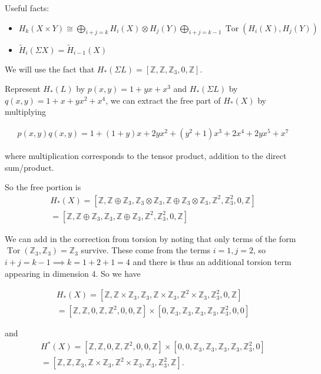 \begin{solution}

Useful facts:

\begin{itemize}
\tightlist
\item
  \(H_{k}(X\times Y) \cong \bigoplus _{{i+j=k}}H_{i}(X)\otimes H_{j}(Y) \bigoplus_{i+j=k-1}\operatorname{Tor}(H_i(X), H_j(Y))\)
\item
  \(\tilde H_i(\Sigma X) = \tilde H_{i-1}(X)\)
\end{itemize}

We will use the fact that
\(H_*(\Sigma L) = [{\mathbb{Z}}, {\mathbb{Z}}, {\mathbb{Z}}_3, 0, {\mathbb{Z}}]\).

Represent \(H_*(L)\) by \(p(x, y) = 1 + yx + x^3\) and \(H_*(\Sigma L)\)
by \(q(x,y) = 1 + x + yx^2 + x^4\), we can extract the free part of
\(H_*(X)\) by multiplying

\begin{align*}p(x,y)q(x,y) = 1 + (1+y)x + 2yx^2 + (y^2+1)x^3 + 2x^4 + 2yx^5 + x^7\end{align*}

where multiplication corresponds to the tensor product, addition to the
direct sum/product.

So the free portion is
\begin{align*}H_*(X) = [{\mathbb{Z}}, {\mathbb{Z}}\oplus {\mathbb{Z}}_3, {\mathbb{Z}}_3\otimes{\mathbb{Z}}_3, {\mathbb{Z}}\oplus {\mathbb{Z}}_3\otimes{\mathbb{Z}}_3, {\mathbb{Z}}^2, {\mathbb{Z}}_3^2, 0, {\mathbb{Z}}] \\
=[{\mathbb{Z}}, {\mathbb{Z}}\oplus {\mathbb{Z}}_3, {\mathbb{Z}}_3, {\mathbb{Z}}\oplus {\mathbb{Z}}_3, {\mathbb{Z}}^2, {\mathbb{Z}}_3^2, 0, {\mathbb{Z}}]
\end{align*}

We can add in the correction from torsion by noting that only terms of
the form
\(\operatorname{Tor}({\mathbb{Z}}_3, {\mathbb{Z}}_3) = {\mathbb{Z}}_3\)
survive. These come from the terms \(i=1, j=2\), so
\(i+j=k-1 \implies k = 1+2+1 = 4\) and there is thus an additional
torsion term appearing in dimension 4. So we have

\begin{align*}H_*(X) = [{\mathbb{Z}}, {\mathbb{Z}}\times {\mathbb{Z}}_3, {\mathbb{Z}}_3, {\mathbb{Z}}\times {\mathbb{Z}}_3, {\mathbb{Z}}^2 \times {\mathbb{Z}}_3, {\mathbb{Z}}_3^2, 0, {\mathbb{Z}}] \\ = [{\mathbb{Z}}, {\mathbb{Z}}, 0,{\mathbb{Z}},{\mathbb{Z}}^2,0,0,{\mathbb{Z}}] \times [0,{\mathbb{Z}}_3,{\mathbb{Z}}_3,{\mathbb{Z}}_3,{\mathbb{Z}}_3,{\mathbb{Z}}_3^2,0,0]\end{align*}

and
\begin{align*}H^*(X)= [{\mathbb{Z}}, {\mathbb{Z}}, 0,{\mathbb{Z}},{\mathbb{Z}}^2,0,0,{\mathbb{Z}}] \times [0, 0,{\mathbb{Z}}_3,{\mathbb{Z}}_3,{\mathbb{Z}}_3,{\mathbb{Z}}_3,{\mathbb{Z}}_3^2,0] \\ = [{\mathbb{Z}}, {\mathbb{Z}}, {\mathbb{Z}}_3,{\mathbb{Z}}\times {\mathbb{Z}}_3,{\mathbb{Z}}^2\times {\mathbb{Z}}_3,{\mathbb{Z}}_3,{\mathbb{Z}}_3^2,{\mathbb{Z}}].\end{align*}

\end{solution}

